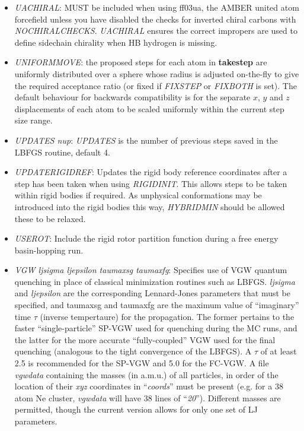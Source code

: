 \documentclass[12pt,a4paper,dvips]{article}
\begin{document}
\begin{itemize}
\item {\it UACHIRAL\/}: MUST be included when using ff03ua, the AMBER united atom forcefield unless you have disabled the checks for inverted chiral carbons
 with {\it NOCHIRALCHECKS\/}. {\it UACHIRAL\/} ensures the correct impropers are used to define sidechain chirality when HB hydrogen is missing. 

\item {\it UNIFORMMOVE\/}: the proposed steps for each atom in {\bf takestep} are uniformly
distributed over a sphere whose radius is adjusted on-the-fly to give the required acceptance
ratio (or fixed if {\it FIXSTEP\/} or {\it FIXBOTH\/} is set).
The default behaviour for backwards compatibility is for the separate $x$, $y$ and $z$ displacements
of each atom to be scaled uniformly within the current step size range.

\item {\it UPDATES nup\/}: {\it UPDATES\/} is the number of previous steps saved in the LBFGS routine,
default 4.

\item {\it UPDATERIGIDREF\/}: Updates the rigid body reference coordinates after a step has been taken when using
{\it RIGIDINIT}. This allows steps to be taken within rigid bodies if required. As unphysical conformations may be introduced
into the rigid bodies this way, {\it HYBRIDMIN} should be allowed these to be relaxed. 

\item {\it USEROT\/}: Include the rigid rotor partition function during a free energy basin-hopping run.

\item {\it VGW ljsigma ljepsilon taumaxsg taumaxfg}: Specifies use of VGW quantum quenching in place of
classical minimization routines such as LBFGS. {\it ljsigma} and {\it ljepsilon} are the corresponding Lennard-Jones
parameters that must be specified, and taumaxsg and taumaxfg are the maximum value of ``imaginary'' time $\tau$ (inverse tempertaure) for the propagation.
The former pertains to the faster ``single-particle'' SP-VGW used for quenching during the MC runs, and the latter for the more accurate
``fully-coupled'' VGW used for the final quenching (analogous to the tight convergence of the LBFGS). A $\tau$ of at least
2.5 is recommended for the SP-VGW and 5.0 for the FC-VGW. A file {\it vgwdata} containing the masses (in a.m.u.) of all particles, in order of the location
of their {\it xyz} coordinates in ``{\it coords}'' must be present (e.g. for a 38 atom Ne cluster, {\it vgwdata} will have 38 lines of ``{\it 20}''). Different
masses are permitted, though the current version allows for only one set of LJ parameters. 


\end{itemize}
\end{document}
